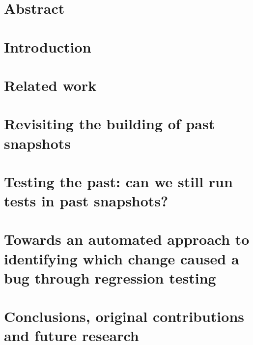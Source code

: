\documentclass[11pt,a4paper,twoside]{book}
\begin{document}
\frontmatter





\chapter{Abstract}




\mainmatter
\restoreHeader

\chapter{Introduction}
\label{sec:intro} 
 

\chapter{Related work}
\label{sec:related-work-chapter}


\chapter{Revisiting the building of past snapshots}
\label{sec:buildability-chapter}


\chapter{Testing the past: can we still run tests in past snapshots?}
\label{sec:testability-chapter}


\chapter{Towards an automated approach to identifying which change caused a bug through regression testing}
\label{sec:bug-hunter-chapter}


\chapter{Conclusions, original contributions and future research}
\label{sec:conclusions}


\backmatter

%
%



\end{document}
